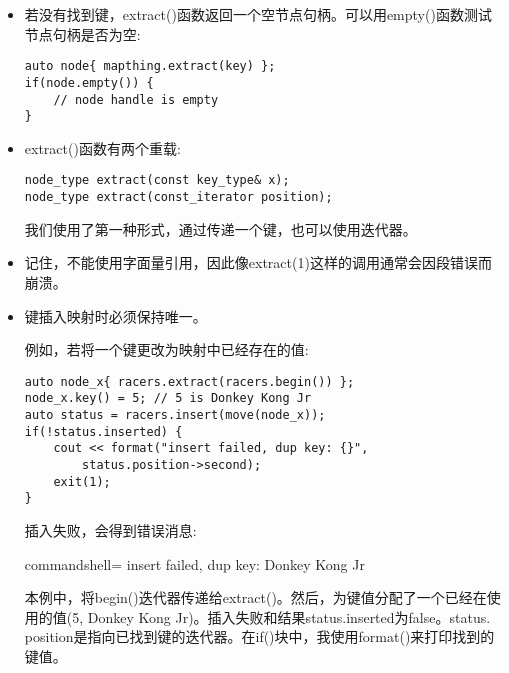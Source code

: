 \begin{itemize}
\item 
若没有找到键，extract()函数返回一个空节点句柄。可以用empty()函数测试节点句柄是否为空:

\begin{lstlisting}[style=styleCXX]
auto node{ mapthing.extract(key) };
if(node.empty()) {
	// node handle is empty
}
\end{lstlisting}

\item 
extract()函数有两个重载:

\begin{lstlisting}[style=styleCXX]
node_type extract(const key_type& x);
node_type extract(const_iterator position);
\end{lstlisting}

我们使用了第一种形式，通过传递一个键，也可以使用迭代器。

\item 
记住，不能使用字面量引用，因此像extract(1)这样的调用通常会因段错误而崩溃。

\item 
键插入映射时必须保持唯一。

例如，若将一个键更改为映射中已经存在的值:

\begin{lstlisting}[style=styleCXX]
auto node_x{ racers.extract(racers.begin()) };
node_x.key() = 5; // 5 is Donkey Kong Jr
auto status = racers.insert(move(node_x));
if(!status.inserted) {
	cout << format("insert failed, dup key: {}",
		status.position->second);
	exit(1);
}
\end{lstlisting}

插入失败，会得到错误消息:

\begin{tcblisting}{commandshell={}}
insert failed, dup key: Donkey Kong Jr
\end{tcblisting}

本例中，将begin()迭代器传递给extract()。然后，为键值分配了一个已经在使用的值(5, Donkey Kong Jr)。插入失败和结果status.inserted为false。status. position是指向已找到键的迭代器。在if()块中，我使用format()来打印找到的键值。
\end{itemize}







